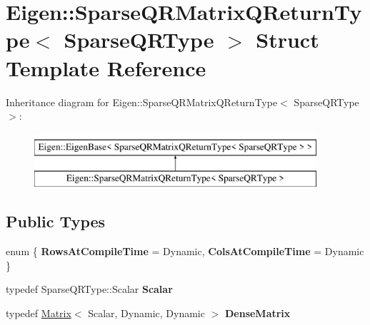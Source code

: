 \hypertarget{struct_eigen_1_1_sparse_q_r_matrix_q_return_type}{}\section{Eigen\+::Sparse\+Q\+R\+Matrix\+Q\+Return\+Type$<$ Sparse\+Q\+R\+Type $>$ Struct Template Reference}
\label{struct_eigen_1_1_sparse_q_r_matrix_q_return_type}
Inheritance diagram for Eigen\+::Sparse\+Q\+R\+Matrix\+Q\+Return\+Type$<$ Sparse\+Q\+R\+Type $>$\+:\begin{figure}[H]
\begin{center}
\leavevmode
\includegraphics[height=2.000000cm]{struct_eigen_1_1_sparse_q_r_matrix_q_return_type}
\end{center}
\end{figure}
\subsection*{Public Types}
\begin{DoxyCompactItemize}
\item 
\mbox{\label{struct_eigen_1_1_sparse_q_r_matrix_q_return_type_a300f97186b8443b06edce7cd952eed8a}} 
enum \{ {\bfseries Rows\+At\+Compile\+Time} = Dynamic, 
{\bfseries Cols\+At\+Compile\+Time} = Dynamic
 \}
\item 
\mbox{\label{struct_eigen_1_1_sparse_q_r_matrix_q_return_type_aec649b2f0533b4765b8c39b4c2283e35}} 
typedef Sparse\+Q\+R\+Type\+::\+Scalar {\bfseries Scalar}
\item 
\mbox{\label{struct_eigen_1_1_sparse_q_r_matrix_q_return_type_ac71399a3aabf19dcb8a33d0287a7f04b}} 
typedef \mbox{\hyperlink{class_eigen_1_1_matrix}{Matrix}}$<$ Scalar, Dynamic, Dynamic $>$ {\bfseries Dense\+Matrix}
\end{DoxyCompactItemize}
